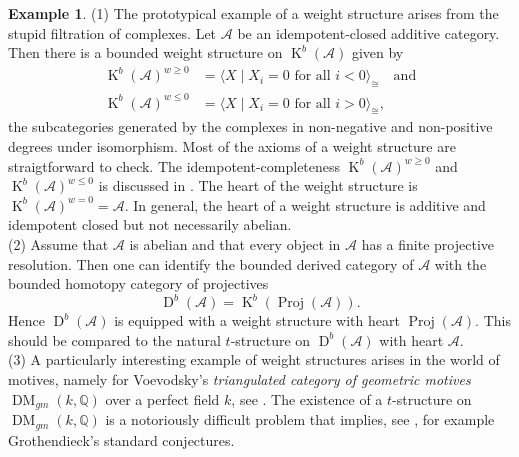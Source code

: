 \documentclass{amsart}
\theoremstyle{plain}
\theoremstyle{TheoremNum}
\theoremstyle{definition}
\newtheorem{example}[theorem]{Example}
\theoremstyle{remark}
\numberwithin{equation}{section}
\newcommand{\Q}{\mathbb{Q}}
\newcommand{\Aa}{\mathcal{A}}
\newcommand{\DM}{\operatorname{DM}}
\newcommand{\K}{\operatorname{K}}
\begin{document}
\begin{example}\label{exp:exampleweightstructures}
(1) The prototypical example of a weight structure arises from the stupid filtration of complexes. Let $\Aa$ be an idempotent-closed additive category. Then there is a bounded weight structure on $\K^b(\Aa)$ given by
\begin{align*}
    \K^b(\Aa)^{w\geq 0}&=\langle X \mid X_i = 0\text{ for all }i < 0\rangle_{\cong} \,\,\,\,\text{ and}\\
    \K^b(\Aa)^{w\leq 0}&=\langle X \mid X_i = 0\text{ for all }i > 0\rangle_{\cong},
\end{align*}
the subcategories generated by the complexes in non-negative and non-positive degrees under isomorphism. Most of the axioms of a weight structure are straigtforward to check. The idempotent-completeness $\K^b(\Aa)^{w\geq 0}$ and $\K^b(\Aa)^{w\leq 0}$ is discussed in \cite{schnurerHomotopyCategoriesIdempotent2011a}.
The heart of the weight structure is $\K^b(\Aa)^{w=0}=\Aa.$ In general, the heart of a weight structure is additive and idempotent closed but not necessarily abelian.
\\\noindent
(2) Assume that $\Aa$ is abelian and that every object in $\Aa$ has a finite projective resolution. Then one can identify the bounded derived category of $\Aa$ with the bounded homotopy category of projectives
$$\operatorname{D}^b(\mathcal{A})=\K^b(\operatorname{Proj}(\Aa)).$$
Hence $\operatorname{D}^b(\mathcal{A})$ is equipped with a weight structure with heart $\operatorname{Proj}(\Aa).$ This should be compared to the natural $t$-structure on $\operatorname{D}^b(\mathcal{A})$ with heart $\Aa.$
\\\noindent
(3) A particularly interesting example of weight structures arises in the world of motives, namely for Voevodsky's \emph{triangulated category of geometric motives}  $\DM_{gm}(k,\Q)$ over a perfect field $k$, see \cite{voevodsky_triangulated_2000}. The existence of a $t$-structure on $\DM_{gm}(k,\Q)$ is a notoriously difficult problem that implies, see \cite{beilinson_remarks_2010}, for example Grothendieck's standard conjectures. 


\end{example}
\end{document}
